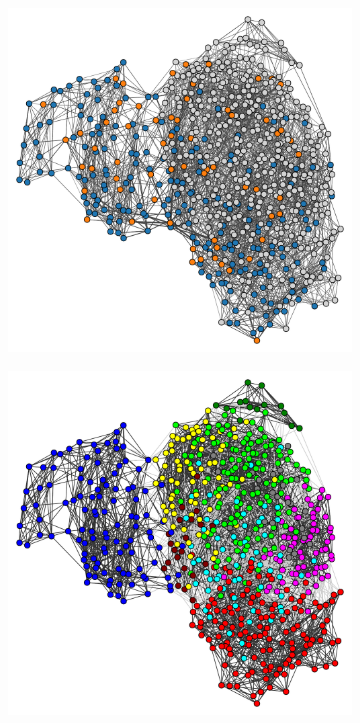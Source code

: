 \begin{figure}[htbp]
  \centering
  \begin{subfigure}[t]{0.7\textwidth}
  \centering
    \includegraphics[width=\linewidth]{graphclust_combined_is20016.pdf}
    \caption{
    }
    \label{fig:graphclustering-combined}
  \end{subfigure}

  \begin{subfigure}[t]{0.7\textwidth}
  \centering
    \includegraphics[width=\linewidth]{graphclust_leiden_is20016.pdf}
    \caption{
    }
    \label{fig:graphclustering-leiden}
  \end{subfigure}


\end{figure}
